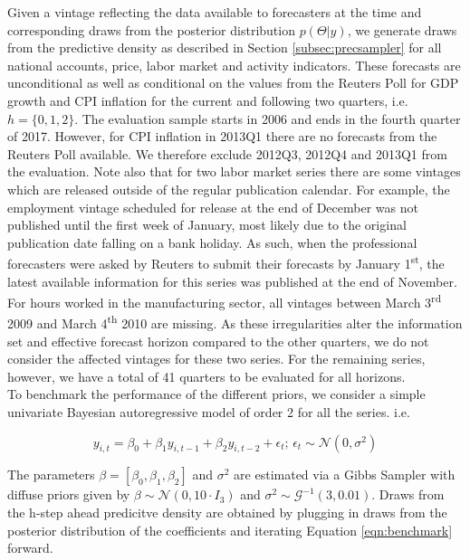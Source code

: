 \documentclass[notitlepage,a4paper,12pt]{article}
\begin{document}
Given a vintage reflecting the data available to forecasters at the time and corresponding draws from the posterior distribution $p(\Theta|y)$, we generate draws from the predictive density as described in Section \ref{subsec:precsampler} for all national accounts, price, labor market and activity indicators. These forecasts are unconditional as well as conditional on the values from the Reuters Poll for GDP growth and CPI inflation for the current and following two quarters, i.e. $h=\{0, 1, 2\}$. The evaluation sample starts in 2006 and ends in the fourth quarter of 2017. However, for CPI inflation in 2013Q1 there are no forecasts from the Reuters Poll available. We therefore exclude 2012Q3, 2012Q4 and 2013Q1 from the evaluation. Note also that for two labor market series there are some vintages which are released outside of the regular publication calendar. For example, the employment vintage scheduled for release at the end of December was not published until the first week of January, most likely due to the original publication date falling on a bank holiday. As such, when the professional forecasters were asked by Reuters to submit their forecasts by January 1\textsuperscript{st}, the latest available information for this series was published at the end of November. For hours worked in the manufacturing sector, all vintages between March 3\textsuperscript{rd} 2009 and March 4\textsuperscript{th} 2010 are missing. As these irregularities alter the information set and effective forecast horizon compared to the other quarters, we do not consider the affected vintages for these two series. For the remaining series, however, we have a total of 41 quarters to be evaluated for all horizons.\\

To benchmark the performance of the different priors, we consider a simple univariate Bayesian autoregressive model of order 2 for all the series.  i.e. 

\begin{equation}\label{eqn:benchmark}
y_{i,t} = \beta_0 + \beta_1 y_{i,t-1} + \beta_2 y_{i,t-2} + \epsilon_t; \, \epsilon_t \sim \mathcal{N}(0, \sigma^2)
\end{equation}

The parameters $\beta = [\beta_0, \beta_1, \beta_2]$  and $\sigma^2$ are estimated via a Gibbs Sampler with diffuse priors given by $\beta \sim \mathcal{N}(0,10 \cdot I_3)$  and $\sigma^2 \sim \mathcal{G}^{-1}(3,0.01)$. Draws from the h-step ahead predicitve density are obtained by plugging in draws from the posterior distribution of the coefficients and iterating Equation \ref{eqn:benchmark} forward.\\
\end{document}
